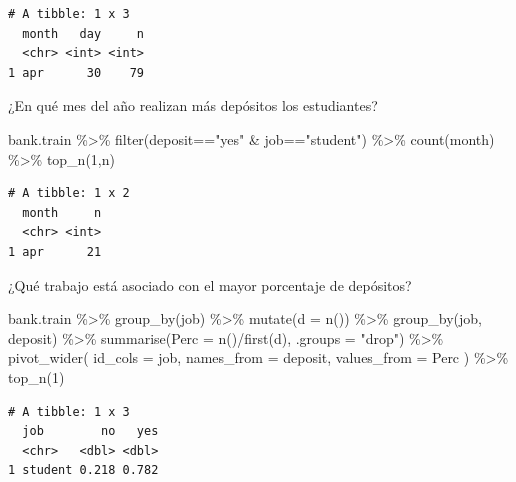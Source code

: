\documentclass[
  letterpaper,
  DIV=11,
  numbers=noendperiod]{scrreprt}
\newenvironment{Shaded}{\begin{snugshade}}{\end{snugshade}}
\newcommand{\AttributeTok}[1]{\textcolor[rgb]{0.40,0.45,0.13}{#1}}
\newcommand{\DecValTok}[1]{\textcolor[rgb]{0.68,0.00,0.00}{#1}}
\newcommand{\FunctionTok}[1]{\textcolor[rgb]{0.28,0.35,0.67}{#1}}
\newcommand{\NormalTok}[1]{\textcolor[rgb]{0.00,0.23,0.31}{#1}}
\newcommand{\SpecialCharTok}[1]{\textcolor[rgb]{0.37,0.37,0.37}{#1}}
\newcommand{\StringTok}[1]{\textcolor[rgb]{0.13,0.47,0.30}{#1}}
\begin{document}
\begin{verbatim}
# A tibble: 1 x 3
  month   day     n
  <chr> <int> <int>
1 apr      30    79
\end{verbatim}

¿En qué mes del año realizan más depósitos los estudiantes?

\begin{Shaded}
\begin{Highlighting}[]
\NormalTok{bank.train }\SpecialCharTok{\%\textgreater{}\%} 
  \FunctionTok{filter}\NormalTok{(deposit}\SpecialCharTok{==}\StringTok{"yes"} \SpecialCharTok{\&}\NormalTok{ job}\SpecialCharTok{==}\StringTok{"student"}\NormalTok{) }\SpecialCharTok{\%\textgreater{}\%} 
  \FunctionTok{count}\NormalTok{(month) }\SpecialCharTok{\%\textgreater{}\%} 
  \FunctionTok{top\_n}\NormalTok{(}\DecValTok{1}\NormalTok{,n)}
\end{Highlighting}
\end{Shaded}

\begin{verbatim}
# A tibble: 1 x 2
  month     n
  <chr> <int>
1 apr      21
\end{verbatim}

¿Qué trabajo está asociado con el mayor porcentaje de depósitos?

\begin{Shaded}
\begin{Highlighting}[]
\NormalTok{bank.train }\SpecialCharTok{\%\textgreater{}\%}
  \FunctionTok{group\_by}\NormalTok{(job) }\SpecialCharTok{\%\textgreater{}\%}
  \FunctionTok{mutate}\NormalTok{(}\AttributeTok{d =} \FunctionTok{n}\NormalTok{()) }\SpecialCharTok{\%\textgreater{}\%}
  \FunctionTok{group\_by}\NormalTok{(job, deposit) }\SpecialCharTok{\%\textgreater{}\%}
  \FunctionTok{summarise}\NormalTok{(}\AttributeTok{Perc =} \FunctionTok{n}\NormalTok{()}\SpecialCharTok{/}\FunctionTok{first}\NormalTok{(d), }\AttributeTok{.groups =} \StringTok{"drop"}\NormalTok{) }\SpecialCharTok{\%\textgreater{}\%}
  \FunctionTok{pivot\_wider}\NormalTok{(}
    \AttributeTok{id\_cols =}\NormalTok{ job,}
    \AttributeTok{names\_from =}\NormalTok{ deposit,}
    \AttributeTok{values\_from =}\NormalTok{ Perc}
\NormalTok{  ) }\SpecialCharTok{\%\textgreater{}\%}
  \FunctionTok{top\_n}\NormalTok{(}\DecValTok{1}\NormalTok{)}
\end{Highlighting}
\end{Shaded}

\begin{verbatim}
# A tibble: 1 x 3
  job        no   yes
  <chr>   <dbl> <dbl>
1 student 0.218 0.782
\end{verbatim}
\end{document}
